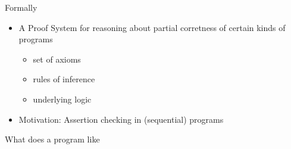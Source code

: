 \documentclass[presentation]{beamer}
\begin{document}
\begin{frame}[label={sec:org26d089b}]{Formally}
\begin{itemize}
\item A Proof System for reasoning about \alert{partial corretness} of certain kinds of programs
\begin{itemize}
\item set of axioms
\item rules of inference
\item underlying logic
\end{itemize}
\item \alert{Motivation}: Assertion checking in (sequential) programs
\end{itemize}
\end{frame}
\begin{frame}[label={sec:orgbf4be46},fragile]{What does a program like}
\end{frame}
\end{document}
